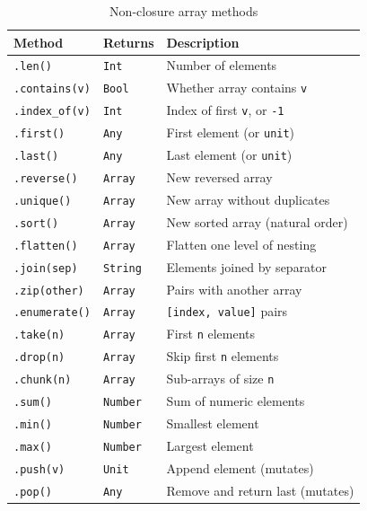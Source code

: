 \begin{table}[ht]
\centering
\begin{tabular}{lll}
\toprule
\textbf{Method} & \textbf{Returns} & \textbf{Description} \\
\midrule
\lstinline|.len()| & \lstinline|Int| & Number of elements \\
\lstinline|.contains(v)| & \lstinline|Bool| & Whether array contains \lstinline|v| \\
\lstinline|.index_of(v)| & \lstinline|Int| & Index of first \lstinline|v|, or \lstinline|-1| \\
\lstinline|.first()| & \lstinline|Any| & First element (or \lstinline|unit|) \\
\lstinline|.last()| & \lstinline|Any| & Last element (or \lstinline|unit|) \\
\lstinline|.reverse()| & \lstinline|Array| & New reversed array \\
\lstinline|.unique()| & \lstinline|Array| & New array without duplicates \\
\lstinline|.sort()| & \lstinline|Array| & New sorted array (natural order) \\
\lstinline|.flatten()| & \lstinline|Array| & Flatten one level of nesting \\
\lstinline|.join(sep)| & \lstinline|String| & Elements joined by separator \\
\lstinline|.zip(other)| & \lstinline|Array| & Pairs with another array \\
\lstinline|.enumerate()| & \lstinline|Array| & \lstinline|[index, value]| pairs \\
\lstinline|.take(n)| & \lstinline|Array| & First \lstinline|n| elements \\
\lstinline|.drop(n)| & \lstinline|Array| & Skip first \lstinline|n| elements \\
\lstinline|.chunk(n)| & \lstinline|Array| & Sub-arrays of size \lstinline|n| \\
\lstinline|.sum()| & \lstinline|Number| & Sum of numeric elements \\
\lstinline|.min()| & \lstinline|Number| & Smallest element \\
\lstinline|.max()| & \lstinline|Number| & Largest element \\
\lstinline|.push(v)| & \lstinline|Unit| & Append element (mutates) \\
\lstinline|.pop()| & \lstinline|Any| & Remove and return last (mutates) \\
\bottomrule
\end{tabular}
\caption{Non-closure array methods}\label{tab:array-methods}
\end{table}

